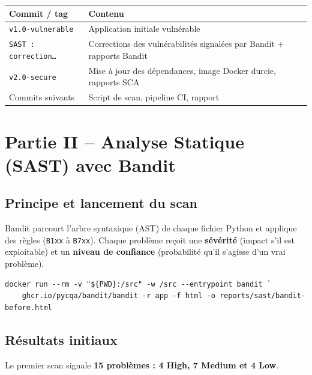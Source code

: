 \documentclass[11pt,a4paper]{article}
\newcommand{\code}[1]{\texttt{#1}}
\begin{document}
\begin{table}[H]
\centering
\begin{tabularx}{\textwidth}{@{}lL@{}}
\toprule
\textbf{Commit / tag} & \textbf{Contenu} \\
\midrule
\code{v1.0-vulnerable} & Application initiale vulnérable \\
\code{SAST : correction\ldots} & Corrections des vulnérabilités signalées par Bandit + rapports Bandit \\
\code{v2.0-secure} & Mise à jour des dépendances, image Docker durcie, rapports SCA \\
Commits suivants & Script de scan, pipeline CI, rapport \\
\bottomrule
\end{tabularx}
\end{table}

\section{Partie II -- Analyse Statique (SAST) avec Bandit}
\subsection{Principe et lancement du scan}
Bandit parcourt l'arbre syntaxique (AST) de chaque fichier Python et applique des règles
(\code{B1xx} à \code{B7xx}). Chaque problème reçoit une \textbf{sévérité} (impact s'il est
exploitable) et un \textbf{niveau de confiance} (probabilité qu'il s'agisse d'un vrai problème).

\begin{lstlisting}[caption={Lancement de Bandit via Docker}]
docker run --rm -v "${PWD}:/src" -w /src --entrypoint bandit `
    ghcr.io/pycqa/bandit/bandit -r app -f html -o reports/sast/bandit-before.html
\end{lstlisting}

\subsection{Résultats initiaux}
Le premier scan signale \textbf{15 problèmes : 4 High, 7 Medium et 4 Low}.
\end{document}
